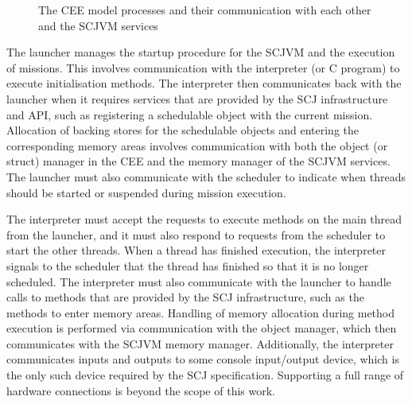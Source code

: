 \begin{figure}[ht]
  \centering
  \caption{The CEE model processes and their communication with each
    other and the SCJVM services}
  \label{cee-model-fig}
\end{figure}

The launcher manages the startup procedure for the SCJVM and the
execution of missions.
This involves communication with the interpreter (or C program) to
execute initialisation methods.
The interpreter then communicates back with the launcher when it
requires services that are provided by the SCJ infrastructure and API,
such as registering a schedulable object with the current mission.
Allocation of backing stores for the schedulable objects and entering
the corresponding memory areas involves communication with both the
object (or struct) manager in the CEE and the memory manager of the
SCJVM services.
The launcher must also communicate with the scheduler to indicate when
threads should be started or suspended during mission execution.

The interpreter must accept the requests to execute methods on the
main thread from the launcher, and it must also respond to requests
from the scheduler to start the other threads.
When a thread has finished execution, the interpreter signals to the
scheduler that the thread has finished so that it is no longer
scheduled.
The interpreter must also communicate with the launcher to handle
calls to methods that are provided by the SCJ infrastructure, such as
the methods to enter memory areas.
Handling of memory allocation during method execution is performed via
communication with the object manager, which then communicates with
the SCJVM memory manager.
Additionally, the interpreter communicates inputs and outputs to some
console input/output device, which is the only such device required by
the SCJ specification.
Supporting a full range of hardware connections is beyond the scope of
this work.

